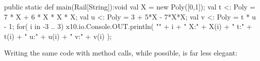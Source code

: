 \begin{xten}
  public static def main(Rail[String]):void {
     val X = new Poly([0,1]);
     val t <: Poly = 7 * X + 6 * X * X * X; 
     val u <: Poly = 3 + 5*X - 7*X*X;
     val v <: Poly = t * u - 1;
     for( i in -3 .. 3) {
       x10.io.Console.OUT.println(
         "" + i + "	X:" + X(i) + "	t:" + t(i) 
         + "	u:" + u(i) + "	v:" + v(i)
         );
     }
  }

\end{xten}

Writing the same code with method calls, while possible, is far less elegant: 

%
%
%
%
%
%
%
%
